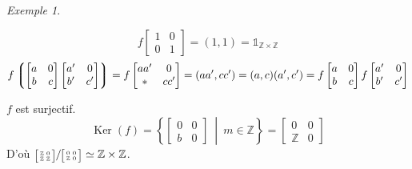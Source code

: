 \documentclass{report}
\theoremstyle{definition}
\theoremstyle{remark}
\newtheorem*{exem}{Exemple}
\def\ZZ{\mathbb{Z}}
\def\id{\mathds{1}}
\def\noyau{\operatorname{Ker}}
\begin{document}
\begin{exem}
\begin{enumerate}
			\[ f\begin{bmatrix}
				1&0\\0&1
			\end{bmatrix} = (1,1) = \id_{\ZZ\times\ZZ} \]
			\[ f\left\lgroup \begin{bmatrix}
				a&0\\b&c
			\end{bmatrix} \begin{bmatrix}
				a'&0\\b'&c'
			\end{bmatrix} \right\rgroup = f\begin{bmatrix}
				aa'&0\\ *&cc'
			\end{bmatrix} = (aa',cc') = (a,c)(a',c') = f\begin{bmatrix}
				a&0\\b&c
			\end{bmatrix} f\begin{bmatrix}
				a'&0\\b'&c'
			\end{bmatrix} \]

			$f$ est surjectif.
			\[ \noyau(f) = \left\{ \begin{bmatrix}
				0&0\\b&0
			\end{bmatrix} ~\middle|~ m\in\ZZ \right\} = \begin{bmatrix}
				0&0\\\ZZ&0
			\end{bmatrix} \]
			D'o\`u $\sfrac{\begin{bsmallmatrix}
					\ZZ&0\\\ZZ&\ZZ
			\end{bsmallmatrix}}{\begin{bsmallmatrix}
				0&0\\\ZZ&0
			\end{bsmallmatrix}} \simeq \ZZ\times\ZZ$.
		\end{enumerate}
	\end{exem}
\end{document}
